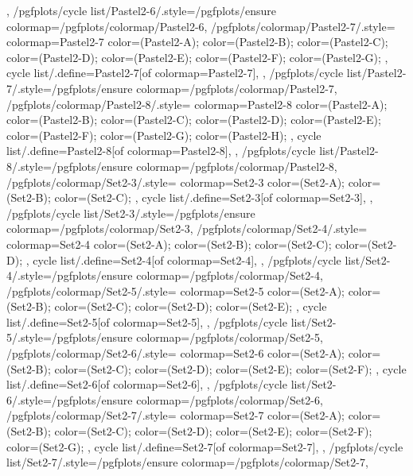 {{  },
  /pgfplots/cycle list/Pastel2-6/.style={/pgfplots/ensure colormap={/pgfplots/colormap/Pastel2-6}},
  /pgfplots/colormap/Pastel2-7/.style={
    colormap={Pastel2-7}{
      color=(Pastel2-A);
      color=(Pastel2-B);
      color=(Pastel2-C);
      color=(Pastel2-D);
      color=(Pastel2-E);
      color=(Pastel2-F);
      color=(Pastel2-G);
    },
    cycle list/.define={Pastel2-7}{[of colormap=Pastel2-7]},
  },
  /pgfplots/cycle list/Pastel2-7/.style={/pgfplots/ensure colormap={/pgfplots/colormap/Pastel2-7}},
  /pgfplots/colormap/Pastel2-8/.style={
    colormap={Pastel2-8}{
      color=(Pastel2-A);
      color=(Pastel2-B);
      color=(Pastel2-C);
      color=(Pastel2-D);
      color=(Pastel2-E);
      color=(Pastel2-F);
      color=(Pastel2-G);
      color=(Pastel2-H);
    },
    cycle list/.define={Pastel2-8}{[of colormap=Pastel2-8]},
  },
  /pgfplots/cycle list/Pastel2-8/.style={/pgfplots/ensure colormap={/pgfplots/colormap/Pastel2-8}},
  /pgfplots/colormap/Set2-3/.style={
    colormap={Set2-3}{
      color=(Set2-A);
      color=(Set2-B);
      color=(Set2-C);
    },
    cycle list/.define={Set2-3}{[of colormap=Set2-3]},
  },
  /pgfplots/cycle list/Set2-3/.style={/pgfplots/ensure colormap={/pgfplots/colormap/Set2-3}},
  /pgfplots/colormap/Set2-4/.style={
    colormap={Set2-4}{
      color=(Set2-A);
      color=(Set2-B);
      color=(Set2-C);
      color=(Set2-D);
    },
    cycle list/.define={Set2-4}{[of colormap=Set2-4]},
  },
  /pgfplots/cycle list/Set2-4/.style={/pgfplots/ensure colormap={/pgfplots/colormap/Set2-4}},
  /pgfplots/colormap/Set2-5/.style={
    colormap={Set2-5}{
      color=(Set2-A);
      color=(Set2-B);
      color=(Set2-C);
      color=(Set2-D);
      color=(Set2-E);
    },
    cycle list/.define={Set2-5}{[of colormap=Set2-5]},
  },
  /pgfplots/cycle list/Set2-5/.style={/pgfplots/ensure colormap={/pgfplots/colormap/Set2-5}},
  /pgfplots/colormap/Set2-6/.style={
    colormap={Set2-6}{
      color=(Set2-A);
      color=(Set2-B);
      color=(Set2-C);
      color=(Set2-D);
      color=(Set2-E);
      color=(Set2-F);
    },
    cycle list/.define={Set2-6}{[of colormap=Set2-6]},
  },
  /pgfplots/cycle list/Set2-6/.style={/pgfplots/ensure colormap={/pgfplots/colormap/Set2-6}},
  /pgfplots/colormap/Set2-7/.style={
    colormap={Set2-7}{
      color=(Set2-A);
      color=(Set2-B);
      color=(Set2-C);
      color=(Set2-D);
      color=(Set2-E);
      color=(Set2-F);
      color=(Set2-G);
    },
    cycle list/.define={Set2-7}{[of colormap=Set2-7]},
  },
  /pgfplots/cycle list/Set2-7/.style={/pgfplots/ensure colormap={/pgfplots/colormap/Set2-7}},
}
